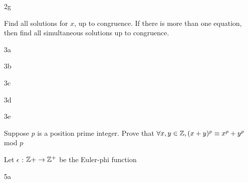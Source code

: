 \begin{question}{2g}

\end{question}



\begin{question}{3}
Find all solutions for $x$, up to congruence. If there is more than one equation, then find all simultaneous solutions up to congruence.
\end{question}


\begin{question}{3a}

\end{question}

\begin{question}{3b}

\end{question}

\begin{question}{3c}

\end{question}

\begin{question}{3d}

\end{question}

\begin{question}{3e}

\end{question}


\begin{question}{4}
Suppose $p$ is a position prime integer. Prove that $\forall x,y \in \mathbb{Z}, (x+y)^p \equiv x^p + y^p$ mod $p$
\end{question}


\begin{question}{5}
Let $\epsilon$ : $\mathbb{Z}+ \rightarrow \mathbb{Z}^+$ be the Euler-phi function
\end{question}


\begin{question}{5a}

\end{question}

